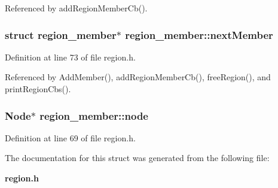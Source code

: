 Referenced by add\-Region\-Member\-Cb().
\subsubsection{\setlength{\rightskip}{0pt plus 5cm}struct \bf{region\_\-member}$\ast$ \bf{region\_\-member::next\-Member}}\label{structregion__member_e73d514285d640c90ed57a626c4243fc}




Definition at line 73 of file region.h.

Referenced by Add\-Member(), add\-Region\-Member\-Cb(), free\-Region(), and print\-Region\-Cbs().
\subsubsection{\setlength{\rightskip}{0pt plus 5cm}\bf{Node}$\ast$ \bf{region\_\-member::node}}\label{structregion__member_5980aaa65118a4038aac5fc81eed62dd}




Definition at line 69 of file region.h.

The documentation for this struct was generated from the following file:\begin{CompactItemize}
\item 
\bf{region.h}\end{CompactItemize}
